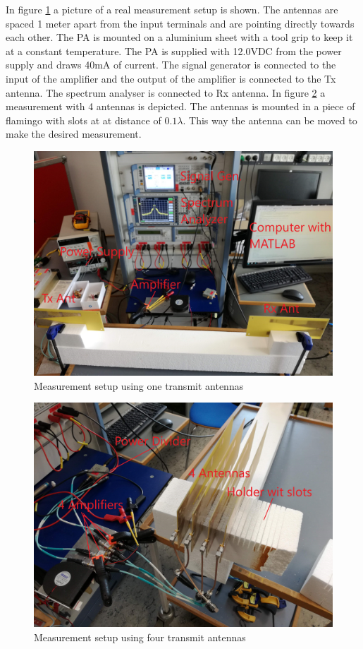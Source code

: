 In figure \ref{fig:Meas_setup} a picture of a real measurement setup is shown. The antennas are spaced 1 meter apart from the input terminals and are pointing directly towards each other. The PA is mounted on a aluminium sheet with a tool grip to keep it at a constant temperature. The PA is supplied with 12.0VDC from the power supply and draws 40mA of current. The signal generator is connected to the input of the amplifier and the output of the amplifier is connected to the Tx antenna. The spectrum analyser is connected to Rx antenna. In figure \ref{fig:Meas_setup4ant} a measurement with 4 antennas is depicted. The antennas is mounted in a piece of flamingo with slots at at distance of $0.1\lambda$. This way the antenna can be moved to make the desired measurement.   


\begin{figure}[H]
\centering 
\includegraphics[scale = 0.1]{figures/measurement/measurement_setup.jpg}
\caption{Measurement setup using one transmit antennas}
\label{fig:Meas_setup}
\end{figure} 

\begin{figure}[H]
\centering 
\includegraphics[scale = 0.1]{figures/measurement/measurement_setup_4.jpg}
\caption{Measurement setup using four transmit antennas}
\label{fig:Meas_setup4ant}
\end{figure} 


